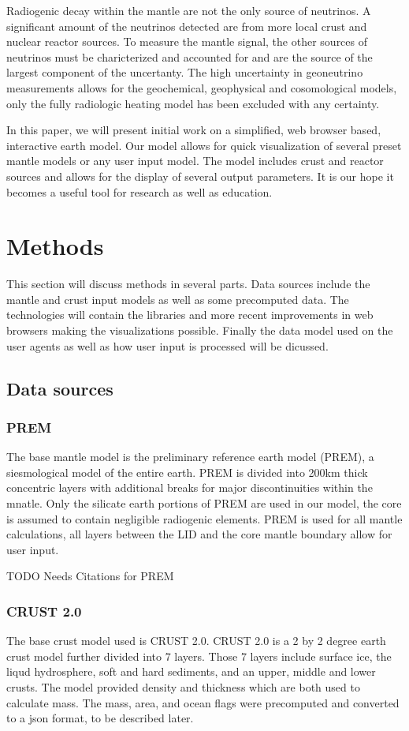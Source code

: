 \documentclass[12pt,a4paper]{article}
\begin{document}
Radiogenic decay within the mantle are not the only source of neutrinos.
A significant amount of the neutrinos detected are from more local crust and nuclear reactor sources.
To measure the mantle signal, the other sources of neutrinos must be charicterized and accounted for and are the source of the largest component of the uncertanty\cite{Dye2010}.
The high uncertainty in geoneutrino measurements allows for the geochemical, geophysical and cosomological models, only the fully radiologic heating model has been excluded with any certainty\cite{McDonough2012}.

In this paper, we will present initial work on a simplified, web browser based, interactive earth model.
Our model allows for quick visualization of several preset mantle models or any user input model.
The model includes crust and reactor sources and allows for the display of several output parameters.
It is our hope it becomes a useful tool for research as well as education.

\section{Methods}
This section will discuss methods in several parts.
Data sources include the mantle and crust input models as well as some precomputed data.
The technologies will contain the libraries and more recent improvements in web browsers making the visualizations possible.
Finally the data model used on the user agents as well as how user input is processed will be dicussed.

\subsection{Data sources}
\subsubsection{PREM}
The base mantle model is the preliminary reference earth model (PREM), a siesmological model of the entire earth.
PREM is divided into 200km thick concentric layers with additional breaks for major discontinuities within the mnatle.
Only the silicate earth portions of PREM are used in our model, the core is assumed to contain negligible radiogenic elements.
PREM is used for all mantle calculations, all layers between the LID and the core mantle boundary allow for user input.

TODO Needs Citations for PREM
\subsubsection{CRUST 2.0}
The base crust model used is CRUST 2.0.
CRUST 2.0 is a 2 by 2 degree earth crust model further divided into 7 layers.
Those 7 layers include surface ice, the liqud hydrosphere, soft and hard sediments, and an upper, middle and lower crusts.
The model provided density and thickness which are both used to calculate mass.
The mass, area, and ocean flags were precomputed and converted to a json format, to be described later.
\end{document}
